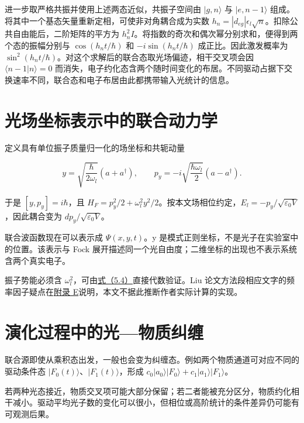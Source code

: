 \documentclass[UTF8,a4paper,zihao=-4,openany,fontset=fandol]{ctexbook}
\begin{document}
进一步取严格共振并使用上述两态近似，共振子空间由 $|g,n\rangle$ 与 $|e,n-1\rangle$ 组成。将其中一个基态矢量重新定相，可使非对角耦合成为实数 $h_n=|d_{eg}|\epsilon_l\sqrt n$。扣除公共自由能后，二阶矩阵的平方为 $h_n^2 I$。将指数的奇次和偶次幂分别求和，便得到两个态的振幅分别与 $\cos(h_nt/\hbar)$ 和 $-i\sin(h_nt/\hbar)$ 成正比。因此激发概率为 $\sin^2(h_nt/\hbar)$。对这个求解后的联合态取光场偏迹，相干交叉项会因 $\langle n-1|n\rangle=0$ 而消失，电子约化态含两个随时间变化的布居。不同驱动占据下交换速率不同，联合态和电子布居由此都携带输入光统计的信息。



\section{光场坐标表示中的联合动力学}\label{sec:05:6}


定义具有单位振子质量归一化的场坐标和共轭动量



\begin{equation*}
y=\sqrt{\frac{\hbar}{2\omega_l}}(a+a^\dagger),\qquad
p_y=-i\sqrt{\frac{\hbar\omega_l}{2}}(a-a^\dagger).
\tag{5.4}\label{eq:5.4}
\end{equation*}


于是 $[y,p_y]=i\hbar$，且 $H_F=p_y^2/2+\omega_l^2y^2/2$。按本文场相位约定，$E_l=-p_y/\sqrt{\varepsilon_0V}$，因此耦合变为 $d p_y/\sqrt{\varepsilon_0V}$。



联合波函数现在可以表示成 $\Psi(x,y,t)$。y 是模式正则坐标，不是光子在实验室中的位置。该表示与 Fock 展开描述同一个光自由度；二维坐标的出现也不表示系统含两个真实电子。



振子势能必须含 $\omega_l^2$，可由\hyperref[eq:5.4]{式（5.4）}直接代数验证。Liu 论文方法段相应文字的频率因子疑点在\hyperref[ch:E]{附录 E}说明，本文不据此推断作者实际计算的实现。



\section{演化过程中的光—物质纠缠}\label{sec:05:7}


联合源即使从乘积态出发，一般也会变为纠缠态。例如两个物质通道可对应不同的驱动条件态 $|F_0(t)\rangle$、$|F_1(t)\rangle$，形成 $c_0|a_0\rangle|F_0\rangle+c_1|a_1\rangle|F_1\rangle$。



若两种光态接近，物质交叉项可能大部分保留；若二者能被充分区分，物质约化相干减小。驱动平均光子数的变化可以很小，但相位或高阶统计的条件差异仍可能有可观测后果。
\end{document}
